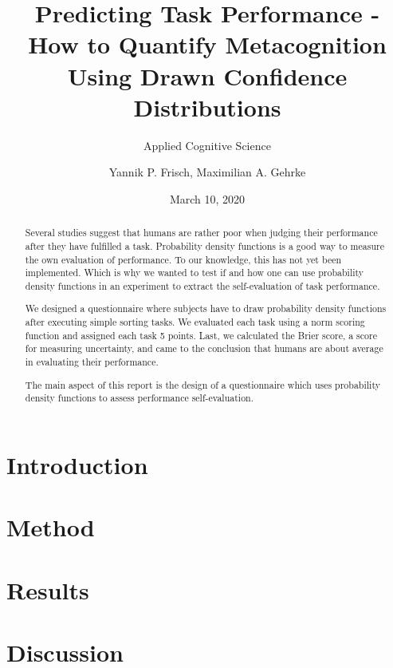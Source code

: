\documentclass[
pdfa=false,  %
color=9c,
logo=body,
class=article,
marginpar=false,
logofile=../logos/tuda_logo.pdf
]{tudapub}
\author{Yannik P. Frisch, Maximilian A. Gehrke}
\title{Predicting Task Performance - How to Quantify Metacognition Using Drawn Confidence Distributions}
\date{March 10, 2020}
\subtitle{Applied Cognitive Science}
\begin{document}
\maketitle

\begin{abstract}
	Several studies suggest that humans are rather poor when judging their performance after they have fulfilled a task. Probability density functions is a good way to measure the own evaluation of performance. To our knowledge, this has not yet been implemented. Which is why we wanted to test if and how one can use probability density functions in an experiment to extract the self-evaluation of task performance.
	
	We designed a questionnaire where subjects have to draw probability density functions after executing simple sorting tasks. We evaluated each task using a norm scoring function and assigned each task 5 points. Last, we calculated the Brier score, a score for measuring uncertainty, and came to the conclusion that humans are about average in evaluating their performance.
	
	The main aspect of this report is the design of a questionnaire which uses probability density functions to assess performance self-evaluation. 
\end{abstract}

\newpage
\section{Introduction}
	\label{sec:introduction}
	
	
\newpage
\section{Method}
	\label{sec:method}
	
	
\newpage
\section{Results}
	\label{sec:results}
	
	
\newpage
\section{Discussion}
	\label{sec:discussion}
	
\end{document}
